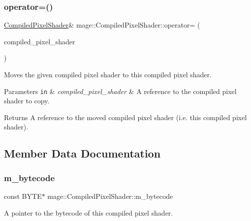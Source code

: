 \subsubsection{\texorpdfstring{operator=()}{operator=()}\hspace{0.1cm}{\footnotesize\ttfamily [2/2]}}
{\footnotesize\ttfamily \hyperlink{structmage_1_1_compiled_pixel_shader}{Compiled\+Pixel\+Shader}\& mage\+::\+Compiled\+Pixel\+Shader\+::operator= (\begin{DoxyParamCaption}\item[{\hyperlink{structmage_1_1_compiled_pixel_shader}{Compiled\+Pixel\+Shader} \&\&}]{compiled\+\_\+pixel\+\_\+shader }\end{DoxyParamCaption})\hspace{0.3cm}{\ttfamily [delete]}}

Moves the given compiled pixel shader to this compiled pixel shader.


\begin{DoxyParams}[1]{Parameters}
\mbox{\tt in}  & {\em compiled\+\_\+pixel\+\_\+shader} & A reference to the compiled pixel shader to copy. \\
\hline
\end{DoxyParams}
\begin{DoxyReturn}{Returns}
A reference to the moved compiled pixel shader (i.\+e. this compiled pixel shader). 
\end{DoxyReturn}


\subsection{Member Data Documentation}
\hypertarget{structmage_1_1_compiled_pixel_shader_a2adf1a1c219968ecf2f47b1aa01a67cb}{}\label{structmage_1_1_compiled_pixel_shader_a2adf1a1c219968ecf2f47b1aa01a67cb} 
\subsubsection{\texorpdfstring{m\+\_\+bytecode}{m\_bytecode}}
{\footnotesize\ttfamily const B\+Y\+TE$\ast$ mage\+::\+Compiled\+Pixel\+Shader\+::m\+\_\+bytecode}

A pointer to the bytecode of this compiled pixel shader. \hypertarget{structmage_1_1_compiled_pixel_shader_ac0b980e08fad328ac4774820b30208aa}{}\label{structmage_1_1_compiled_pixel_shader_ac0b980e08fad328ac4774820b30208aa} 
